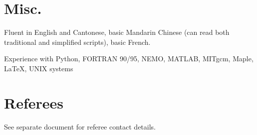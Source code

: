 \documentclass[letterpaper]{article}
\renewenvironment{itemize}{
  \begin{list}{}{
    \setlength{\leftmargin}{1.5em}
  }
}{
  \end{list}
}
\begin{document}
\section*{Misc.}
\begin{itemize}
	\item[--] Fluent in English and Cantonese, basic Mandarin Chinese (can read
	both traditional and simplified scripts), basic French.
	\item[--] Experience with Python, FORTRAN 90/95, NEMO, MATLAB, MITgcm, Maple,
	\LaTeX, UNIX systems
\end{itemize}
\section*{Referees}
See separate document for referee contact details.
%	
%	
\end{document}
